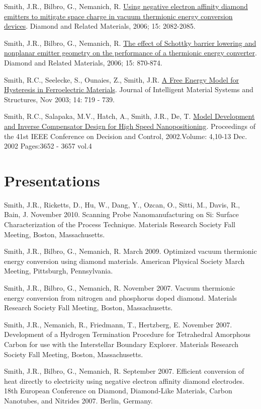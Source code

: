 \documentclass[letterpaper,margin,line]{res}
\begin{document}
\begin{resume}
Smith, J.R., Bilbro, G., Nemanich, R. \href{http://dx.doi.org/10.1016/j.diamond.2006.09.011}{Using negative electron affinity diamond emitters to mitigate space charge in vacuum thermionic energy conversion devices}. Diamond and Related Materials, 2006; 15: 2082-2085.

Smith, J.R., Bilbro, G., Nemanich, R. \href{http://dx.doi.org/10.1016/j.diamond.2005.12.057}{The effect of Schottky barrier lowering and nonplanar emitter geometry on the performance of a thermionic energy converter}. Diamond and Related Materials, 2006; 15: 870-874.

Smith, R.C., Seelecke, S., Ounaies, Z., Smith, J.R. \href{http://dx.doi.org/10.1177/1045389X03038841}{A Free Energy Model for Hysteresis in Ferroelectric Materials}. Journal of Intelligent Material Systems and Structures, Nov 2003;  14:  719 - 739.

Smith, R.C., Salapaka, M.V., Hatch, A., Smith, J.R., De, T. \href{http://dx.doi.org/10.1109/CDC.2002.1184930}{Model Development and Inverse Compensator Design for High Speed Nanopositioning}. Proceedings of the 41st IEEE Conference on Decision and Control, 2002.Volume: 4,10-13 Dec. 2002 Pages:3652  - 3657 vol.4


\section{\sc Presentations}
Smith, J.R., Ricketts, D., Hu, W., Dang, Y., Ozcan, O., Sitti, M., Davis, R., Bain, J. November 2010. Scanning Probe Nanomanufacturing on Si: Surface Characterization of the Process Technique. Materials Research Society Fall Meeting, Boston, Massachusetts.

Smith, J.R., Bilbro, G., Nemanich, R. March 2009. Optimized vacuum thermionic energy conversion using diamond materials. American Physical Society March Meeting, Pittsburgh, Pennsylvania.

Smith, J.R., Bilbro, G., Nemanich, R. November 2007. Vacuum thermionic energy conversion from nitrogen and phosphorus doped diamond. Materials Research Society Fall Meeting, Boston, Massachusetts.

Smith, J.R., Nemanich, R., Friedmann, T., Hertzberg, E. November 2007. Development of a Hydrogen Termination Procedure for Tetrahedral Amorphous Carbon for use with the Interstellar Boundary Explorer. Materials Research Society Fall Meeting, Boston, Massachusetts.

Smith, J.R., Bilbro, G., Nemanich, R. September 2007. Efficient conversion of heat directly to electricity using negative electron affinity diamond electrodes. 18th European Conference on Diamond, Diamond-Like Materials, Carbon Nanotubes, and Nitrides 2007. Berlin, Germany.


\end{resume}
\end{document}
